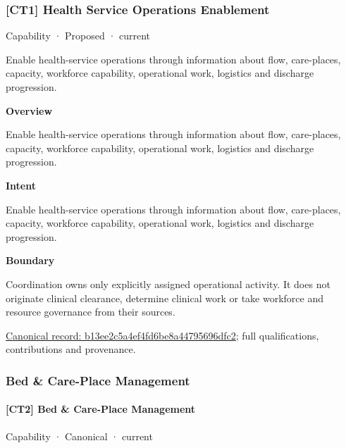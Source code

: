 \subsubsection{[CT1] Health Service Operations Enablement}

\label{element:b13ee2c5a4ef4fd6be8a44795696dfc2}
{\small Capability · Proposed · current}\par

Enable health-service operations through information about flow, care-places, capacity, workforce capability, operational work, logistics and discharge progression.



\textbf{Overview}



Enable health-service operations through information about flow, care-places, capacity, workforce capability, operational work, logistics and discharge progression.



\textbf{Intent}



Enable health-service operations through information about flow, care-places, capacity, workforce capability, operational work, logistics and discharge progression.



\textbf{Boundary}



Coordination owns only explicitly assigned operational activity. It does not originate clinical clearance, determine clinical work or take workforce and resource governance from their sources.


{\footnotesize \href{../../../../continuum/strategy/capability/b13ee2c5a4ef4fd6be8a44795696dfc2.md}{Canonical record: b13ee2c5a4ef4fd6be8a44795696dfc2}; full qualifications, contributions and provenance.}\par
\subsubsection{Bed \& Care-Place Management}

\paragraph{[CT2] Bed \& Care-Place Management}

\label{element:f117ccec0bfa4f738e6ddb646b3534a2}
{\small Capability · Canonical · current}\par

